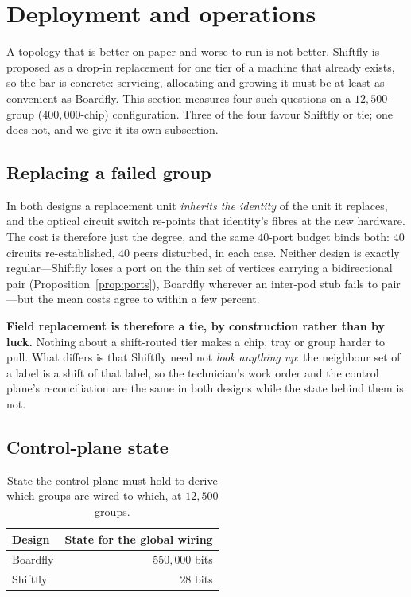 \documentclass[sigconf,nonacm]{acmart}
\theoremstyle{acmdefinition}%
\begin{document}
\section{Deployment and operations}
\label{sec:ops}

A topology that is better on paper and worse to run is not better. Shiftfly is
proposed as a drop-in replacement for one tier of a machine that already exists,
so the bar is concrete: servicing, allocating and growing it must be at least as
convenient as Boardfly. This section measures four such questions on a
$12{,}500$-group ($400{,}000$-chip) configuration. Three of the four favour
Shiftfly or tie; one does not, and we give it its own subsection.

\subsection{Replacing a failed group}

In both designs a replacement unit \emph{inherits the identity} of the unit it
replaces, and the optical circuit switch re-points that identity's fibres at the
new hardware. The cost is therefore just the degree, and the same $40$-port
budget binds both: $40$ circuits re-established, $40$ peers disturbed, in each
case. Neither design is exactly regular---Shiftfly loses a port on the thin set
of vertices carrying a bidirectional pair (Proposition~\ref{prop:ports}),
Boardfly wherever an inter-pod stub fails to pair---but the mean costs agree to
within a few percent.

\textbf{Field replacement is therefore a tie, by construction rather than by
luck.} Nothing about a shift-routed tier makes a chip, tray or group harder to
pull. What differs is that Shiftfly need not \emph{look anything up}: the
neighbour set of a label is a shift of that label, so the technician's work
order and the control plane's reconciliation are the same in both designs while
the state behind them is not.

\subsection{Control-plane state}

\begin{table}[t]
\centering\small
\begin{tabular}{lr}
\toprule
Design & State for the global wiring \\
\midrule
Boardfly & $550{,}000$ bits \\
Shiftfly & $28$ bits \\
\bottomrule
\end{tabular}
\caption{State the control plane must hold to derive which groups are wired to
which, at $12{,}500$ groups.}
\label{tab:state}
\end{table}
\end{document}
